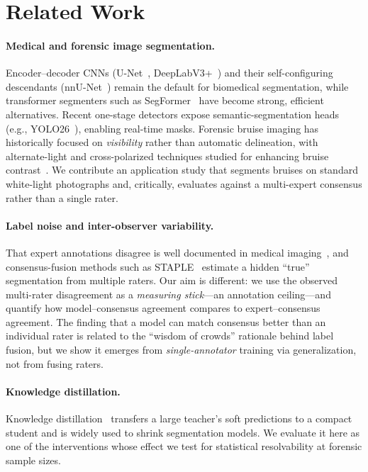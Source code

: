 \documentclass[letterpaper,twocolumn,10pt]{article}
\begin{document}
\section{Related Work}
\paragraph{Medical and forensic image segmentation.}
Encoder--decoder CNNs (U-Net~\cite{unet}, DeepLabV3+~\cite{deeplabv3plus}) and their
self-configuring descendants (nnU-Net~\cite{nnunet}) remain the default for
biomedical segmentation, while transformer segmenters such as
SegFormer~\cite{segformer} have become strong, efficient alternatives. Recent
one-stage detectors expose semantic-segmentation heads (e.g.,
YOLO26~\cite{yolo26}), enabling real-time masks. Forensic bruise imaging has
historically focused on \emph{visibility} rather than automatic delineation, with
alternate-light and cross-polarized techniques studied for enhancing bruise
contrast~\cite{scafide}. We contribute an application study that segments bruises
on standard white-light photographs and, critically, evaluates against a
multi-expert consensus rather than a single rater.

\paragraph{Label noise and inter-observer variability.}
That expert annotations disagree is well documented in medical
imaging~\cite{joskowicz,warfield}, and consensus-fusion methods such as
STAPLE~\cite{warfield} estimate a hidden ``true'' segmentation from multiple
raters. Our aim is different: we use the observed multi-rater disagreement as a
\emph{measuring stick}---an annotation ceiling---and quantify how model--consensus
agreement compares to expert--consensus agreement. The finding that a model can
match consensus better than an individual rater is related to the ``wisdom of
crowds'' rationale behind label fusion, but we show it emerges from
\emph{single-annotator} training via generalization, not from fusing raters.

\paragraph{Knowledge distillation.}
Knowledge distillation~\cite{hinton} transfers a large teacher's soft predictions
to a compact student and is widely used to shrink segmentation models. We evaluate
it here as one of the interventions whose effect we test for statistical
resolvability at forensic sample sizes.
\end{document}

